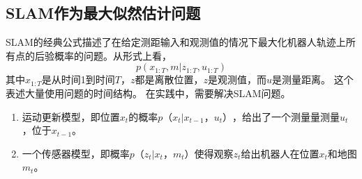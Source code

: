 \subsection{SLAM作为最大似然估计问题}


SLAM的经典公式描述了在给定测距输入和观测值的情况下最大化机器人轨迹上所有点的后验概率的问题。从形式上看，
\begin{equation}
p(x_{1:T},m|z_{1:T},u_{1:T})
\end{equation}
其中$ x_{1:T} $是从时间1到时间$ T $，$ z $都是离散位置，$ z $是观测值，而$ u $是测量距离。 这个表述大量使用问题的时间结构。 在实践中，需要解决SLAM问题。


\begin{enumerate}
\item 运动更新模型，即位置$ x_t $的概率$ p（x_t | x_ {t-1}，u_t）$，给出了一个测量量测量$ u_t $，位于$ x_{t-1}$。
\item 一个传感器模型，即概率$ p（z_t | x_t，m_t）$使得观察$ z_t $给出机器人在位置$ x_t $和地图$ m_t $。
\end{enumerate}


